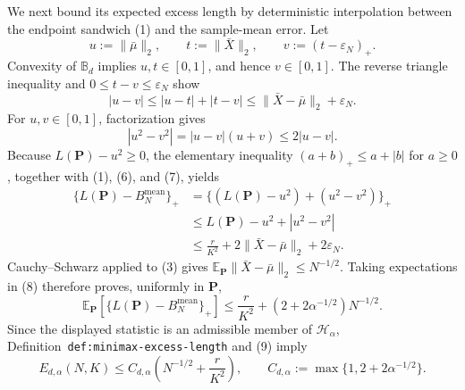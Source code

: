 We next bound its expected excess length by deterministic interpolation between the endpoint sandwich (1) and the sample-mean error.  Let
\[
u:=\|\bar\mu\|_2,
\qquad
t:=\|\bar X\|_2,
\qquad
v:=(t-\varepsilon_N)_+.
\]
Convexity of \(\mathbb B_d\) implies \(u,t\in[0,1]\), and hence \(v\in[0,1]\).  The reverse triangle inequality and \(0\le t-v\le\varepsilon_N\) show
\[
|u-v|
\le |u-t|+|t-v|
\le \|\bar X-\bar\mu\|_2+\varepsilon_N.                                  \tag{6}
\]
For \(u,v\in[0,1]\), factorization gives
\[
|u^2-v^2|=|u-v|(u+v)\le2|u-v|.                                            \tag{7}
\]
Because \(L(\mathbf P)-u^2\ge0\), the elementary inequality
\((a+b)_+\le a+|b|\) for \(a\ge0\), together with (1), (6), and (7), yields
\[
\begin{aligned}
\{L(\mathbf P)-B_N^{\mathrm{mean}}\}_+
&=\{(L(\mathbf P)-u^2)+(u^2-v^2)\}_+ \\
&\le L(\mathbf P)-u^2+|u^2-v^2| \\
&\le \frac r{K^2}
   +2\|\bar X-\bar\mu\|_2+2\varepsilon_N.
\end{aligned}                                                             \tag{8}
\]
Cauchy--Schwarz applied to (3) gives
\(
\mathbb E_{\mathbf P}\|\bar X-\bar\mu\|_2\le N^{-1/2}
\).
Taking expectations in (8) therefore proves, uniformly in \(\mathbf P\),
\[
\mathbb E_{\mathbf P}
  [\{L(\mathbf P)-B_N^{\mathrm{mean}}\}_+]
\le \frac r{K^2}
 +(2+2\alpha^{-1/2})N^{-1/2}.                                             \tag{9}
\]
Since the displayed statistic is an admissible member of \(\mathcal H_\alpha\), Definition~\texttt{def:minimax-excess-length} and (9) imply
\[
E_{d,\alpha}(N,K)
\le C_{d,\alpha}\left(N^{-1/2}+\frac r{K^2}\right),
\qquad
C_{d,\alpha}:=\max\{1,2+2\alpha^{-1/2}\}.                               \tag{10}
\]

